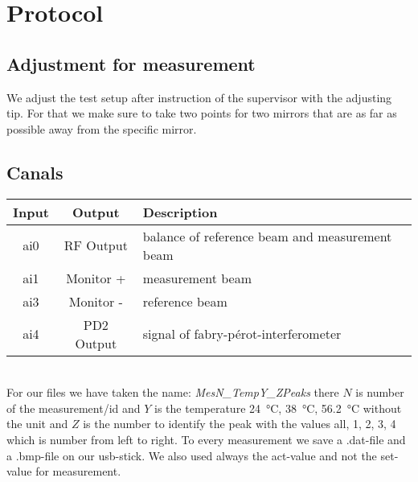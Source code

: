
\chapter{Protocol}
\label{chap:protocol}

\section*{Adjustment for measurement}
We adjust the test setup after instruction of the supervisor with the adjusting tip. For that we make sure to take two points for two mirrors that are as far as possible away from the specific mirror.

\section*{Canals}

\begin{tabular}[]{c|c|l}
    Input & Output & Description\\
    \hline
    ai0 & RF Output & balance of reference beam and measurement beam\\
    ai1 & Monitor + & measurement beam\\
    ai3 & Monitor - & reference beam\\
    ai4 & PD2 Output & signal of fabry-pérot-interferometer\\
\end{tabular}\\

For our files we have taken the name: \textit{MesN\_TempY\_ZPeaks} there $N$ is number of the measurement/id and $Y$ is the temperature \SI{24}{\celsius}, \SI{38}{\celsius}, \SI{56,2}{\celsius} without the unit and $Z$ is the number to identify the peak with the values all, 1, 2, 3, 4 which is number from left to right.
To every measurement we save a .dat-file and a .bmp-file on our usb-stick.
We also used always the act-value and not the set-value for measurement.

